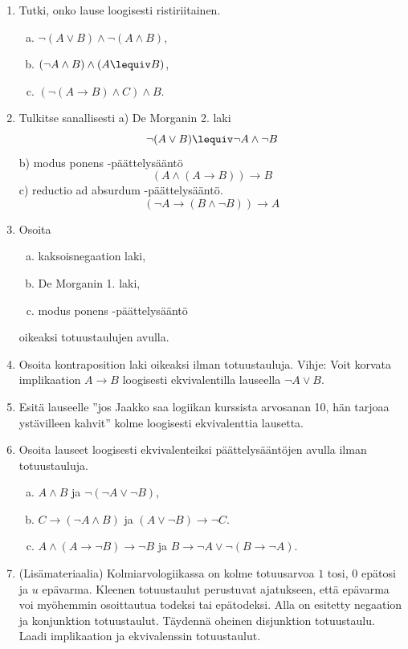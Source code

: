 \begin{enumerate}
\item Tutki, onko lause loogisesti ristiriitainen.
\begin{enumerate}[a)]
\item $\lnot (A \lor B) \land \lnot (A\land B)$,
\item $(\lnot A \land B) \land (A \lequiv B)$,
\item $(\lnot (A \to B) \land C) \land B$.
\end{enumerate}

\item Tulkitse sanallisesti a)
De Morganin 2. laki
\[
\lnot (A\lor B) \lequiv \lnot A\land \lnot B
\]
b)
modus ponens -päättelysääntö
\[
(A \land (A\to B))\to B
\]
c)
reductio ad absurdum -päättelysääntö.
\[
(\lnot A \to (B\land \lnot B))\to A
\]

\item Osoita
\begin{enumerate}[a)]
\item kaksoisnegaation laki,
\item De Morganin 1. laki,
\item modus ponens -päättelysääntö
\end{enumerate}
oikeaksi totuustaulujen avulla.

\item Osoita kontraposition laki oikeaksi ilman
totuustauluja.
Vihje: Voit korvata implikaation $A\to B$ loogisesti
ekvivalentilla lauseella $\lnot A \lor B$.

\item Esitä lauseelle ''jos Jaakko saa logiikan kurssista
arvosanan 10, hän tarjoaa ystävilleen kahvit'' kolme
loogisesti ekvivalenttia lausetta.

\item Osoita lauseet loogisesti ekvivalenteiksi
päättelysääntöjen avulla ilman totuustauluja.
\begin{enumerate}[a)]
\item $A\land B$ ja $\lnot(\lnot A \lor \lnot B)$,
\item $C\to (\lnot A \land B)$ ja $(A\lor \lnot B)\to
\lnot C$.
\item $A \land (A\to \lnot B)\to \lnot B$ ja $B\to
\lnot A\lor \lnot (B\to \lnot A)$.
\end{enumerate}

\item (Lisämateriaalia) Kolmiarvologiikassa on kolme totuusarvoa $1$
tosi, $0$ epätosi ja $u$ epävarma. Kleenen totuustaulut
perustuvat ajatukseen, että epävarma voi myöhemmin
osoittautua todeksi tai epätodeksi. Alla on esitetty
negaation ja konjunktion totuustaulut. Täydennä
oheinen disjunktion totuustaulu. Laadi implikaation ja
ekvivalenssin totuustaulut.


\end{enumerate}
